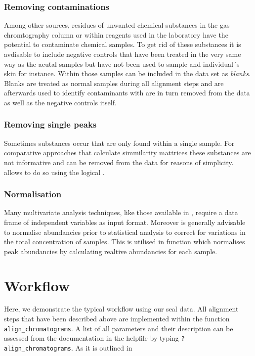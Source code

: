 \subsubsection{Removing contaminations} Among other sources, residues of
unwanted chemical substances in the gas chromtography column or within
reagents used in the laboratory have the potential to contaminate
chemical samples. To get rid of these substances it is avdisable to
include negative controls that have been treated in the very same way as
the acutal samples but have not been used to sample and individual´s
skin for instance. Within  those samples can
be included in the data set as \textit{blanks}. Blanks are treated as
normal samples during all alignment steps and are afterwards used to
identify contaminants with are in turn removed from the data as well as
the negative controls itself. \subsubsection{Removing single peaks}
Sometimes substances occur that are only found within a single sample.
For comparative approaches that calculate simmilarity mattrices these
substances are not informative and can be removed from the data for
reasons of simplicity.  allows to do so using the logical
. \subsubsection{Normalisation} Many
multivariate analysis techniques, like those available in ,
require a data frame of independent variables as input format. Moreover
is generally advisable to normalise abundancies prior to statistical
analysis to correct for variations in the total concentration of
samples. This is utilised in  function
 which normalises peak abundancies by calculating
realtive abundancies for each sample.

\section{Workflow}

Here, we demonstrate the typical workflow using our seal data. All
alignment steps that have been described above are implemented within
the function \texttt{align\_chromatograms}. A list of all parameters and
their description can be assessed from the documentation in the helpfile
by typing \texttt{?align\_chromatograms}. As it is outlined in

